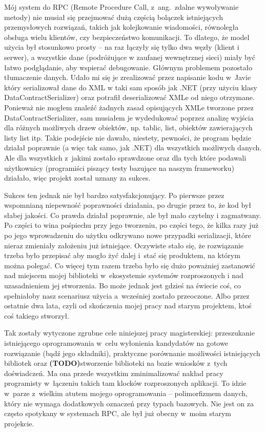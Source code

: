Mój system do RPC (Remote Procedure Call, z~ang.\ zdalne wywoływanie metody) nie musiał się przejmować dużą częścią bolączek istniejących przemysłowych rozwiązań, takich jak kolejkowanie wiadomości, równoległa obsługa wielu klientów, czy bezpieczeństwo komunikacji. To dlatego, że model użycia był stosunkowo prosty -- na raz łączyły się tylko dwa węzły (klient i serwer), a wszystkie dane (podróżujące w zaufanej wewnętrznej sieci) miały być łatwo podglądanie, aby wspierać debugowanie. Głównym problemem pozostało tłumaczenie danych. Udało mi się je zrealizować przez napisanie kodu w~Javie który serializował dane do XML w taki sam sposób jak .NET (przy użyciu klasy DataContractSerializer) oraz potrafił deserializować XMLe od niego otrzymane. Ponieważ nie mogłem znaleźć żadnych zasad opisujących XMLe tworzone przez DataContractSerializer, sam musiałem je wydedukować poprzez analizę wyjścia dla różnych możliwych drzew obiektów, np. tablic, list, obiektów zawierających listy list itp. Takie podejście nie dawało, niestety, pewności, że program będzie działał poprawnie (a więc tak samo, jak .NET) dla wszystkich możliwych danych. Ale dla wszystkich z~jakimi zostało sprawdzone oraz dla tych które podawali użytkownicy (programiści piszący testy bazujące na naszym frameworku) działało, więc projekt został uznany za sukces.

Sukces ten jednak nie był bardzo satysfakcjonujący. Po pierwsze przez wspomnianą niepewność poprawności działania, po drugie przez to, że kod był słabej jakości. Co prawda działał poprawnie, ale był mało czytelny i zagmatwany. Po części to wina pośpiechu przy jego tworzeniu, po części tego, że kilka razy już po jego wprowadzeniu do użytku odkrywano nowe przypadki serializacji, które nieraz zmieniały założeniu już istniejące. Oczywiste stało się, że rozwiązanie trzeba było przepisać aby mogło żyć dalej i~stać się produktem, na którym można polegać. Co więcej tym razem trzeba było się dużo poważniej zastanowić nad miejscem mojej biblioteki w~ekosystemie systemów rozproszonych i nad uzasadnieniem jej stworzenia. Bo może jednak jest gdzieś na świecie coś, co spełniałoby nasz scenariusz użycia a~wcześniej zostało przeoczone. Albo przez ostatnie dwa lata, czyli od skończenia mojej pracy nad starym projektem, ktoś coś takiego stworzył.

Tak zostały wytyczone zgrubne cele niniejszej pracy magisterskiej: przeszukanie istniejącego oprogramowania w~celu wyłonienia kandydatów na gotowe rozwiązanie (bądź jego składniki), praktyczne porównanie możliwości istniejących bibliotek oraz \textbf{(TODO)}stworzenie biblioteki na bazie wniosków z~tych doświadczeń. Ma ona przede wszystkim zminimalizować nakład pracy programisty w~łączeniu takich tam klocków rozproszonych aplikacji. To idzie w~parze z~wielkim atutem mojego oprogramowania -- polimorfizmem danych, który nie wymaga dodatkowych oznaczeń przy typach bazowych. Nie jest on za często spotykany w systemach RPC, ale był już obecny w~moim starym projekcie.

